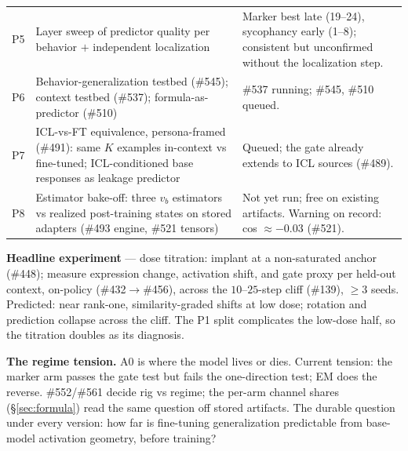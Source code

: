 \documentclass[11pt]{article}
\newcommand{\vb}{v_b}
\begin{document}
\begin{center}
\begin{tabular}{@{}p{0.7cm}p{6.3cm}p{7.4cm}@{}}
\addlinespace[2pt]
P5 & Layer sweep of predictor quality per behavior $+$ independent localization & Marker best late (19--24), sycophancy early (1--8); consistent but unconfirmed without the localization step. \\
\addlinespace[2pt]
P6 & Behavior-generalization testbed (\#545); context testbed (\#537); formula-as-predictor (\#510) & \#537 running; \#545, \#510 queued. \\
\addlinespace[2pt]
P7 & ICL-vs-FT equivalence, persona-framed (\#491): same $K$ examples in-context vs fine-tuned; ICL-conditioned base responses as leakage predictor & Queued; the gate already extends to ICL sources (\#489). \\
\addlinespace[2pt]
P8 & Estimator bake-off: three $\vb$ estimators vs realized post-training states on stored adapters (\#493 engine, \#521 tensors) & Not yet run; free on existing artifacts. Warning on record: cos $\approx -0.03$ (\#521). \\
\bottomrule
\end{tabular}
\end{center}

\textbf{Headline experiment} --- dose titration: implant at a non-saturated anchor (\#448); measure expression change, activation shift, and gate proxy per held-out context, on-policy (\#432$\to$\#456), across the $10$--$25$-step cliff (\#139), $\geq$3 seeds. Predicted: near rank-one, similarity-graded shifts at low dose; rotation and prediction collapse across the cliff. The P1 split complicates the low-dose half, so the titration doubles as its diagnosis.

\textbf{The regime tension.} A0 is where the model lives or dies. Current tension: the marker arm passes the gate test but fails the one-direction test; EM does the reverse. \#552/\#561 decide rig vs regime; the per-arm channel shares (\S\ref{sec:formula}) read the same question off stored artifacts. The durable question under every version: how far is fine-tuning generalization predictable from base-model activation geometry, before training?
\end{document}
